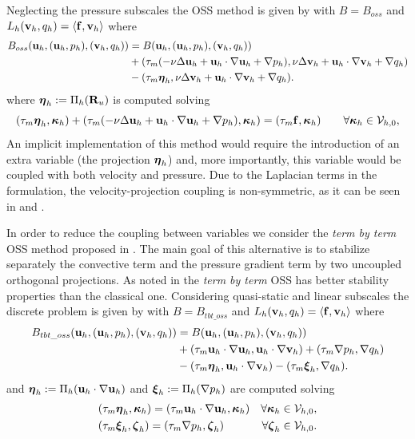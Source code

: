 Neglecting the pressure subscales the OSS method is given by  with $B=B_{oss}$ and $L_h({\bf v}_h,q_h)=\left<{\bf f},{\bf v}_h\right>$ where
\begin{align}
\label{eq-C5_biliniar_oss}
B_{oss}({\bf u}_h,({\bf u}_h,p_h),({\bf v}_h,q_h))&=B({\bf u}_h,({\bf u}_h,p_h),({\bf v}_h,q_h))\\\nonumber
&+(\tau_m(-\nu\Delta{\bf u}_h+{\bf u}_h\cdot\nabla{\bf u}_h+\nabla p_h),\nu\Delta{\bf v}_h+{\bf u}_h\cdot\nabla{\bf v}_h+\nabla q_h)\\\nonumber
&-(\tau_m\boldsymbol{\eta}_h,\nu\Delta{\bf v}_h+{\bf u}_h\cdot\nabla{\bf v}_h+\nabla q_h).
\end{align}
where $\boldsymbol{\eta}_h:=\Pi_h( {\bf R}_u)$ is computed solving
\begin{equation}
\label{eq-C5_NSprojectiondef0}
(\tau_m\boldsymbol{\eta}_h,\boldsymbol{\kappa}_h) + ( \tau_m (-\nu\Delta{\bf u}_h+{\bf u}_h\cdot\nabla{\bf u}_h+\nabla p_h) ,\boldsymbol{\kappa}_h) = (\tau_m {\bf f} ,\boldsymbol{\kappa}_h)  \quad \quad \forall \boldsymbol{\kappa}_h\in\mathcal{V}_{h,0},
\end{equation}
An implicit implementation of this method would require the introduction of an extra variable (the projection $\boldsymbol{\eta}_h$) and, more importantly, this variable would be coupled with both velocity and pressure. Due to the Laplacian terms in the formulation, the velocity-projection coupling is non-symmetric, as it can be seen in  and .

In order to reduce the coupling between variables we consider the \textit{term by term} OSS method proposed in \cite{codina_analysis_2008}. The main goal of this alternative is to stabilize separately the convective term and the pressure gradient term by two uncoupled orthogonal projections. As noted in \cite{codina_analysis_2008} the \textit{term by term} OSS has better stability properties than the classical one. Considering quasi-static and linear subscales the discrete problem is given by  with $B=B_{tbt\_oss}$ and $L_h({\bf v}_h,q_h)=\left<{\bf f},{\bf v}_h\right>$ where
\begin{align}
\label{eq-C5_biliniar_oss_tbt}
B_{tbt\_oss}({\bf u}_h,({\bf u}_h,p_h),({\bf v}_h,q_h))&=B({\bf u}_h,({\bf u}_h,p_h),({\bf v}_h,q_h)) \\ \nonumber
& +(\tau_m{\bf u}_h\cdot\nabla{\bf u}_h,{\bf u}_h\cdot\nabla{\bf v}_h) +(\tau_m\nabla p_h,\nabla q_h)\\\nonumber
& -(\tau_m\boldsymbol{\eta}_h,{\bf u}_h\cdot\nabla{\bf v}_h) - (\tau_m\boldsymbol{\xi}_h,\nabla q_h).
\end{align}
and $\boldsymbol{\eta}_h:=\Pi_h({\bf u}_h\cdot\nabla{\bf u}_h)$ and $\boldsymbol{\xi}_h:=\Pi_h(\nabla p_h)$ are computed solving
\begin{align}
\label{eq-C5_NSprojectiondef1}
&(\tau_m\boldsymbol{\eta}_h,\boldsymbol{\kappa}_h) = (\tau_m {\bf u}_h\cdot\nabla{\bf u}_h,\boldsymbol{\kappa}_h)&\forall \boldsymbol{\kappa}_h\in\mathcal{V}_{h,0},\\
\label{eq-C5_NSprojectiondef2}
&(\tau_m\boldsymbol{\xi}_h,\boldsymbol{\zeta}_h) = (\tau_m \nabla p_h,\boldsymbol{\zeta}_h)&\forall \boldsymbol{\zeta}_h\in\mathcal{V}_{h,0}.
\end{align}

